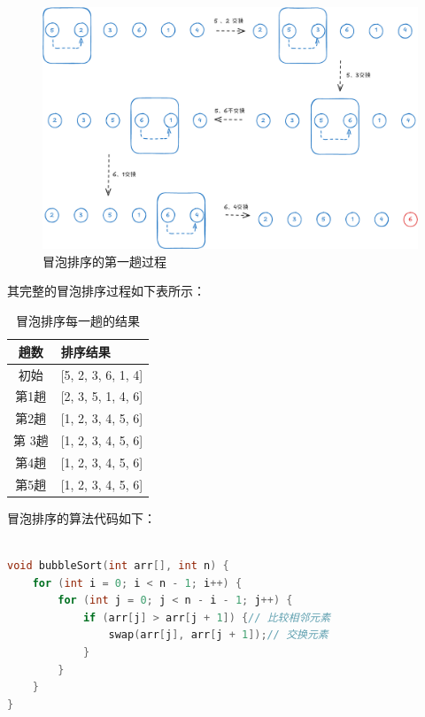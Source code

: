 \documentclass[lang=cn,newtx,10pt,scheme=chinese]{../elegantbook}
\begin{document}
\begin{figure}[h!]
    \centering
    \includegraphics[width=1\textwidth]{./figure/pdf/cropped/bubbleSort.pdf}
    \caption{冒泡排序的第一趟过程}
    \label{fig:bubbleSort}
\end{figure}

其完整的冒泡排序过程如下表所示：
\begin{table}[h!]
\centering
\caption{冒泡排序每一趟的结果}

\label{tab:bubbleSort}

\begin{tabular}{|c|l|}
\hline
\textbf{趟数} & \textbf{排序结果} \\ \hline

初始 & [5, 2, 3, 6, 1, 4] \\ \hline

第1趟 & [2, 3, 5, 1, 4, 6] \\ \hline

第2趟 & [1, 2, 3, 4, 5, 6] \\ \hline

第 3趟 & [1, 2, 3, 4, 5, 6] \\ \hline

第4趟 & [1, 2, 3, 4, 5, 6] \\ \hline

第5趟 & [1, 2, 3, 4, 5, 6] \\ \hline
\end{tabular}

\end{table}

冒泡排序的算法代码如下：

\begin{lstlisting}[language=C++, caption=冒泡排序的算法代码]

void bubbleSort(int arr[], int n) {
    for (int i = 0; i < n - 1; i++) {
        for (int j = 0; j < n - i - 1; j++) {
            if (arr[j] > arr[j + 1]) {// 比较相邻元素
                swap(arr[j], arr[j + 1]);// 交换元素
            }
        }
    }
}

\end{lstlisting}
\end{document}
